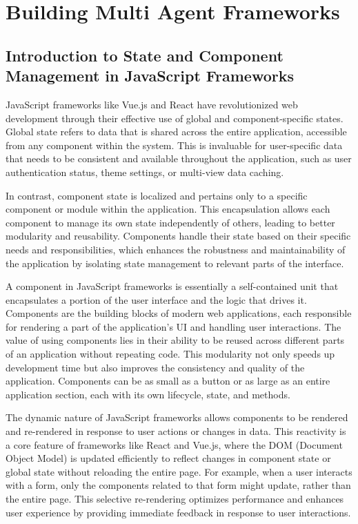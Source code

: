 \section{Building Multi Agent Frameworks}

\subsection{Introduction to State and Component Management in JavaScript Frameworks}

JavaScript frameworks like Vue.js and React have revolutionized web development through their effective use of global and component-specific states. Global state refers to data that is shared across the entire application, accessible from any component within the system. This is invaluable for user-specific data that needs to be consistent and available throughout the application, such as user authentication status, theme settings, or multi-view data caching.

In contrast, component state is localized and pertains only to a specific component or module within the application. This encapsulation allows each component to manage its own state independently of others, leading to better modularity and reusability. Components handle their state based on their specific needs and responsibilities, which enhances the robustness and maintainability of the application by isolating state management to relevant parts of the interface.

A component in JavaScript frameworks is essentially a self-contained unit that encapsulates a portion of the user interface and the logic that drives it. Components are the building blocks of modern web applications, each responsible for rendering a part of the application's UI and handling user interactions. The value of using components lies in their ability to be reused across different parts of an application without repeating code. This modularity not only speeds up development time but also improves the consistency and quality of the application. Components can be as small as a button or as large as an entire application section, each with its own lifecycle, state, and methods.

The dynamic nature of JavaScript frameworks allows components to be rendered and re-rendered in response to user actions or changes in data. This reactivity is a core feature of frameworks like React and Vue.js, where the DOM (Document Object Model) is updated efficiently to reflect changes in component state or global state without reloading the entire page. For example, when a user interacts with a form, only the components related to that form might update, rather than the entire page. This selective re-rendering optimizes performance and enhances user experience by providing immediate feedback in response to user interactions.

